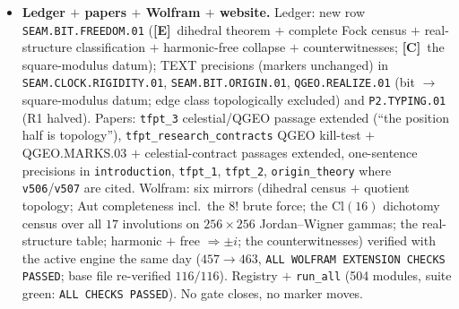 \documentclass[11pt]{article}
\providecommand{\mE}{\textbf{[E]}}\providecommand{\mC}{\textbf{[C]}}
\begin{document}
\begin{itemize}[leftmargin=1.5em]
clock) --- the Fock dichotomy measures the CLASS, not the modulus. Premise typing: (P-i) deck $=$
M\"obius covering deck $\Rightarrow$ free [standard topology; the one-sidedness strand
\texttt{origin\_theory}/\texttt{v456}]; (P-ii) marks on the $\Theta$-fix seam circle $=$ existing
REALIZE \mC\ content (\texttt{QGEO.REALIZE.02} hypotheses, \texttt{v264}) --- NO new input. Audit
finding documented: ``circle-freeness'' was nowhere typed before (only mark-freeness, \texttt{v216});
\texttt{v507} F1.1 explicitly admitted the reflection reading of the edge class --- \texttt{v510}
closes that door (a reflection is not a covering deck). The \mC\ rest, verbatim: \emph{the alignment
bit reduces from ``harmonic AND central'' to the square-modulus datum $\tau=i$ alone; the position
half is topology (edge class excluded), the modulus half stays the one carrier input.}
Discovery provenance: \texttt{experiments/tfpt-discovery/qgeo\_realize\_deck\_freedom\_dihedral\_probe.py}
($14/14$) and \texttt{qgeo\_realize\_rp\_fixcircle\_moebius\_probe.py} ($16/16$), same day.
\item \textbf{Ledger $+$ papers $+$ Wolfram $+$ website.} Ledger: new row
\texttt{SEAM.BIT.FREEDOM.01} (\mE\ dihedral theorem $+$ complete Fock census $+$ real-structure
classification $+$ harmonic-free collapse $+$ counterwitnesses; \mC\ the square-modulus datum);
TEXT precisions (markers unchanged) in \texttt{SEAM.CLOCK.RIGIDITY.01}, \texttt{SEAM.BIT.ORIGIN.01},
\texttt{QGEO.REALIZE.01} (bit $\to$ square-modulus datum; edge class topologically excluded) and
\texttt{P2.TYPING.01} (R1 halved). Papers: \texttt{tfpt\_3} celestial/QGEO passage extended
(``the position half is topology''), \texttt{tfpt\_research\_contracts} QGEO kill-test $+$
QGEO.MARKS.03 $+$ celestial-contract passages extended, one-sentence precisions in
\texttt{introduction}, \texttt{tfpt\_1}, \texttt{tfpt\_2}, \texttt{origin\_theory} where
\texttt{v506}/\texttt{v507} are cited. Wolfram: six mirrors (dihedral census $+$ quotient topology;
Aut completeness incl.\ the $8!$ brute force; the $\mathrm{Cl}(16)$ dichotomy census over all $17$
involutions on $256\times256$ Jordan--Wigner gammas; the real-structure table; harmonic $+$ free
$\Rightarrow\pm i$; the counterwitnesses) verified with the active engine the same day
($457\to463$, \texttt{ALL WOLFRAM EXTENSION CHECKS PASSED}; base file re-verified $116/116$).
Registry $+$ \texttt{run\_all} (504 modules, suite green: \texttt{ALL CHECKS PASSED}).
No gate closes, no marker moves.
\end{itemize}
\end{document}
